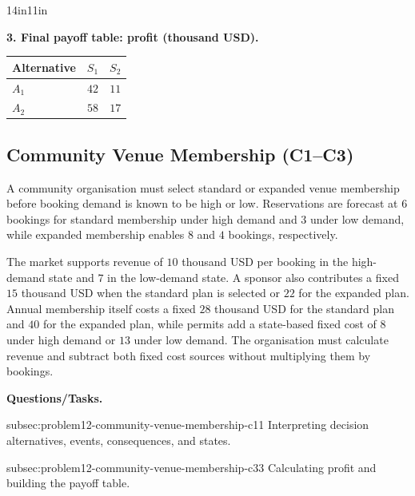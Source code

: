 \begin{CalculationLandscape}{14in}{11in}
\noindent\begin{minipage}{\linewidth}
\textbf{3. Final payoff table: profit (thousand USD).}
\begin{center}
\begin{tabular}{@{}lcc@{}}
\toprule
Alternative & \(S_1\) & \(S_2\) \\
\midrule
\(A_1\) & \(42\) & \(11\) \\
\(A_2\) & \(58\) & \(17\) \\
\bottomrule
\end{tabular}
\end{center}
\end{minipage}



\end{CalculationLandscape}


	\subsection{Community Venue Membership (C1--C3)}
	\label{sec:problem12-community-venue-membership-c1-c3}

	A community organisation must select standard or expanded venue membership before booking demand is known to be high or low. Reservations are forecast at \(6\) bookings for standard membership under high demand and \(3\) under low demand, while expanded membership enables \(8\) and \(4\) bookings, respectively.

	The market supports revenue of \(10\) thousand USD per booking in the high-demand state and \(7\) in the low-demand state. A sponsor also contributes a fixed \(15\) thousand USD when the standard plan is selected or \(22\) for the expanded plan. Annual membership itself costs a fixed \(28\) thousand USD for the standard plan and \(40\) for the expanded plan, while permits add a state-based fixed cost of \(8\) under high demand or \(13\) under low demand. The organisation must calculate revenue and subtract both fixed cost sources without multiplying them by bookings.

	\textbf{Questions/Tasks.}
	\begin{enumerate}
		\CriterionTask
		{subsec:problem12-community-venue-membership-c1}{1}
		{Interpreting decision alternatives, events, consequences, and states.}

		\CriterionTask
		{subsec:problem12-community-venue-membership-c3}{3}
		{Calculating profit and building the payoff table.}
	\end{enumerate}

